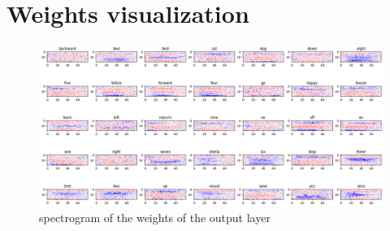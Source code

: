 \documentclass[eng]{class}
\begin{document}
\section{Weights visualization}
\begin{figure}[h]
  \centering
  \includegraphics[width=0.8\linewidth]{images/spectrogram_weights.png}
  \caption{spectrogram of the weights of the output layer}
  \label{fig-9}
\end{figure}
\end{document}
